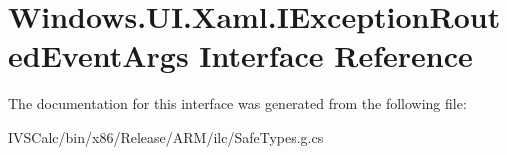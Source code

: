\hypertarget{interface_windows_1_1_u_i_1_1_xaml_1_1_i_exception_routed_event_args}{}\section{Windows.\+U\+I.\+Xaml.\+I\+Exception\+Routed\+Event\+Args Interface Reference}
\label{interface_windows_1_1_u_i_1_1_xaml_1_1_i_exception_routed_event_args}


The documentation for this interface was generated from the following file\+:\begin{DoxyCompactItemize}
\item 
I\+V\+S\+Calc/bin/x86/\+Release/\+A\+R\+M/ilc/Safe\+Types.\+g.\+cs\end{DoxyCompactItemize}
